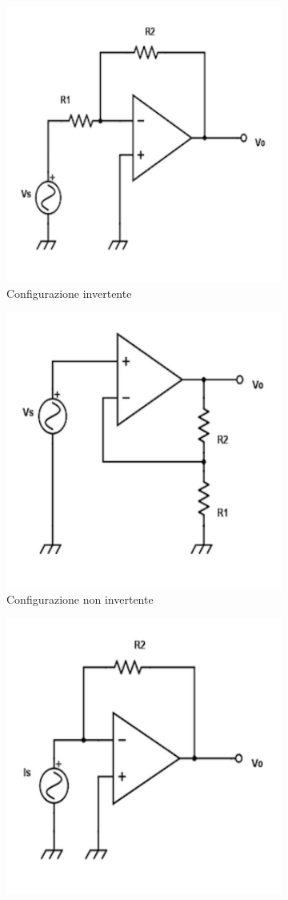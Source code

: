 \documentclass[a4paper,portrait,12pt]{article}
\theoremstyle{definition}
\begin{document}
\begin{figure}[H]
\begin{subfigure}{.5\textwidth}
\centering
\includegraphics[width=.5\linewidth]{img/invertente.pdf}
\caption{Configurazione invertente}
\label{fig:invertente}
\end{subfigure}
\begin{subfigure}{.5\textwidth}
\centering
\includegraphics[width=.5\linewidth]{img/noninvertente.pdf}
\caption{Configurazione non invertente}
\label{fig:noninvertente}
\end{subfigure}
\begin{subfigure}{.5\textwidth}
\centering
\includegraphics[width=.5\linewidth]{img/transresistenza.pdf}

\end{subfigure}
\end{figure}
\end{document}
